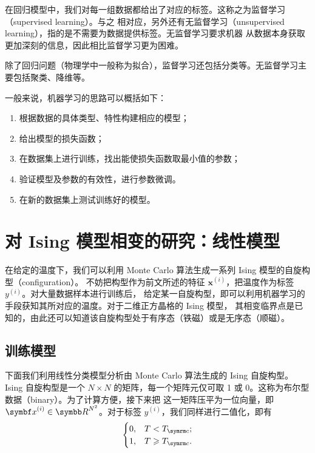 在回归模型中，我们对每一组数据都给出了对应的标签。这称之为监督学习（supervised learning）。与之
相对应，另外还有无监督学习（unsupervised learning），指的是不需要为数据提供标签。无监督学习要求机器
从数据本身获取更加深刻的信息，因此相比监督学习更为困难。

除了回归问题（物理学中一般称为拟合），监督学习还包括分类等。无监督学习主要包括聚类、降维等。

一般来说，机器学习的思路可以概括如下：

\begin{enumerate}
  \item 根据数据的具体类型、特性构建相应的模型；
  \item 给出模型的损失函数；
  \item 在数据集上进行训练，找出能使损失函数取最小值的参数；
  \item 验证模型及参数的有效性，进行参数微调。
  \item 在新的数据集上测试训练好的模型。
\end{enumerate}

\section{对 Ising 模型相变的研究：线性模型}

在给定的温度下，我们可以利用 Monte Carlo 算法生成一系列 Ising 模型的自旋构型（configuration）。
不妨把构型作为前文所述的特征 $\bm{x}^{(i)}$，把温度作为标签 $y^{(i)}$。对大量数据样本进行训练后，
给定某一自旋构型，即可以利用机器学习的手段获知其所对应的温度。对于二维正方晶格的 Ising 模型，
其相变临界点是已知的，由此还可以知道该自旋构型处于有序态（铁磁）或是无序态（顺磁）。

\subsection{训练模型}

下面我们利用线性分类模型分析由 Monte Carlo 算法生成的 Ising 自旋构型。Ising 自旋构型是一个
$N\times N$ 的矩阵，每一个矩阵元仅可取 1 或 0。这称为布尔型数据（binary）。为了计算方便，接下来把
这一矩阵压平为一位向量，即 $\bm{x}^{(i)}\in\R^{N^2}$。对于标签 $y^{(i)}$，我们同样进行二值化，即有
\begin{equation}
  \begin{cases}
    0, & T <         \Tc; \\
    1, & T \geqslant \Tc.
  \end{cases}
\end{equation}


